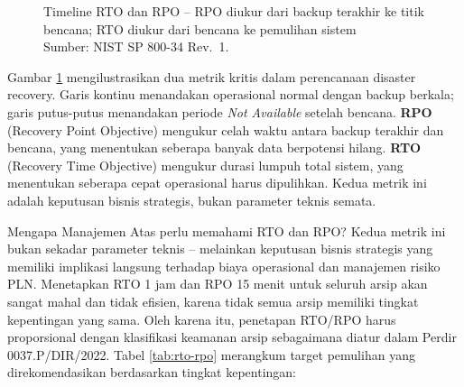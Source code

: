 \documentclass[12pt,a4paper]{report}
\begin{document}
\begin{figure}[htbp]
{%
}
\caption{Timeline RTO dan RPO -- RPO diukur dari backup terakhir ke titik bencana; RTO diukur dari bencana ke pemulihan sistem\\
\small Sumber: NIST SP 800-34 Rev.~1.}
\label{fig:rto-rpo}
\end{figure}

\small Gambar \ref{fig:rto-rpo} mengilustrasikan dua metrik kritis dalam perencanaan disaster recovery. Garis kontinu menandakan operasional normal dengan backup berkala; garis putus-putus menandakan periode \textit{Not Available} setelah bencana. \textbf{RPO} (Recovery Point Objective) mengukur celah waktu antara backup terakhir dan bencana, yang menentukan seberapa banyak data berpotensi hilang. \textbf{RTO} (Recovery Time Objective) mengukur durasi lumpuh total sistem, yang menentukan seberapa cepat operasional harus dipulihkan. Kedua metrik ini adalah keputusan bisnis strategis, bukan parameter teknis semata.

Mengapa Manajemen Atas perlu memahami RTO dan RPO? Kedua metrik ini bukan sekadar parameter teknis -- melainkan keputusan bisnis strategis yang memiliki implikasi langsung terhadap biaya operasional dan manajemen risiko PLN. Menetapkan RTO 1 jam dan RPO 15 menit untuk seluruh arsip akan sangat mahal dan tidak efisien, karena tidak semua arsip memiliki tingkat kepentingan yang sama. Oleh karena itu, penetapan RTO/RPO harus proporsional dengan klasifikasi keamanan arsip sebagaimana diatur dalam Perdir 0037.P/DIR/2022. Tabel \ref{tab:rto-rpo} merangkum target pemulihan yang direkomendasikan berdasarkan tingkat kepentingan:
\end{document}
